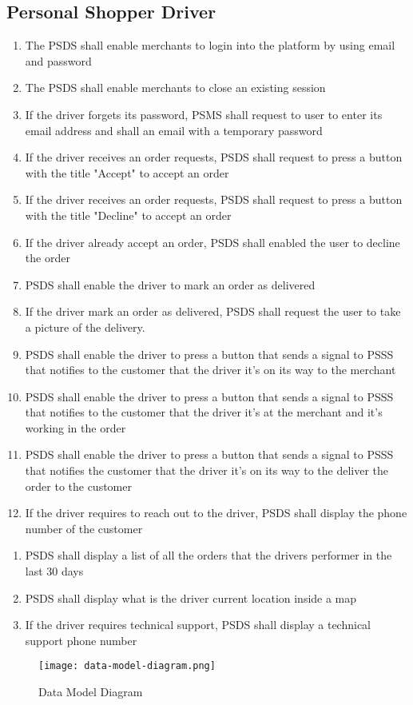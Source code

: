 \subsection{Personal Shopper Driver}
\begin{enumerate}[resume, label=SY-\arabic*]
    \item  The PSDS shall enable merchants to login into the platform by 
    using email and password
    \item  The PSDS shall enable merchants to close an existing session
    \item  If the driver forgets its password, PSMS shall request to user to 
    enter its email address and shall an email with a temporary password
    \item  If the driver receives an order requests, PSDS shall request to 
    press a button with the title "Accept" to accept an order
    \item  If the driver receives an order requests, PSDS shall request to 
    press a button with the title "Decline" to accept an order
    \item  If the driver already accept an order, PSDS shall enabled the 
    user to decline the order
    \item  PSDS shall enable the driver to mark an order as delivered
	\item  If the driver mark an order as delivered, PSDS shall request the 
    user to take a picture of the delivery.
    \item  PSDS shall enable the driver to press a button that sends a signal 
    to PSSS that notifies to the customer that the driver it's on its 
    way to the merchant
    \item  PSDS shall enable the driver to press a button that sends a signal 
    to PSSS that notifies to the customer that the driver it's at the 
    merchant and it's working in the order
    \item  PSDS shall enable the driver to press a button that sends a signal 
    to PSSS that notifies the customer that the driver it's on its way to the 
    deliver the order to the customer
    \item  If the driver requires to reach out to the driver, PSDS shall 
    display the phone number of the customer
\end{enumerate}
\pagebreak
\begin{enumerate}[resume, label=SY-\arabic*]
    \item  PSDS shall display a list of all the orders that the drivers 
    performer in the last 30 days
    \item  PSDS shall display what is the driver current location inside a map
    \item  If the driver requires technical support, PSDS shall display a 
    technical support phone number
\end{enumerate}

\begin{figure}[!htb]
    \centering
    \texttt{[image: data-model-diagram.png]}
    \caption{Data Model Diagram}
\end{figure}